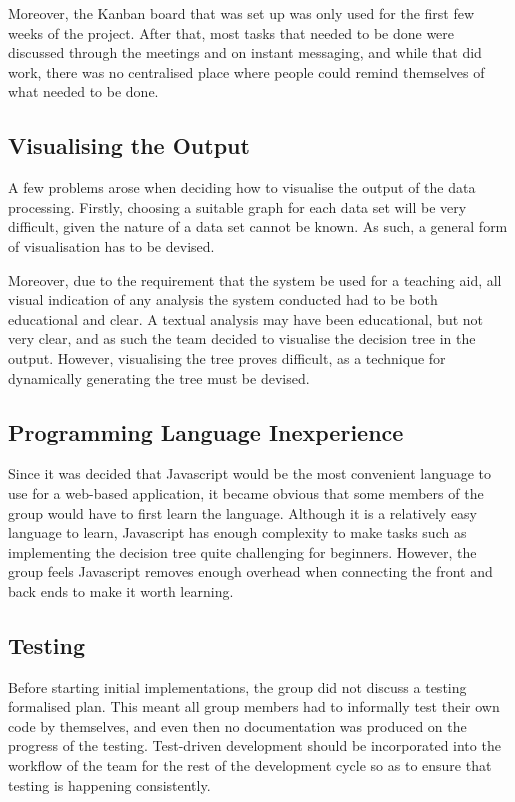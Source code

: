 \documentclass[a4paper,titlepage]{article}
\begin{document}
Moreover, the Kanban board that was set up was only used for the first few weeks of the project.
After that, most tasks that needed to be done were discussed through the meetings and on instant messaging, and while that did work, there was no centralised place where people could remind themselves of what needed to be done.

\subsection{Visualising the Output}
A few problems arose when deciding how to visualise the output of the data processing.
Firstly, choosing a suitable graph for each data set will be very difficult, given the nature of a data set cannot be known.
As such, a general form of visualisation has to be devised.

Moreover, due to the requirement that the system be used for a teaching aid, all visual indication of any analysis the system conducted had to be both educational and clear.
A textual analysis may have been educational, but not very clear, and as such the team decided to visualise the decision tree in the output.
However, visualising the tree proves difficult, as a technique for dynamically generating the tree must be devised.

\subsection{Programming Language Inexperience}
Since it was decided that Javascript would be the most convenient language to use for a web-based application, it became obvious that some members of the group would have to first learn the language.
Although it is a relatively easy language to learn, Javascript has enough complexity to make tasks such as implementing the decision tree quite challenging for beginners.
However, the group feels Javascript removes enough overhead when connecting the front and back ends to make it worth learning.

\subsection{Testing}
Before starting initial implementations, the group did not discuss a testing formalised plan.
This meant all group members had to informally test their own code by themselves, and even then no documentation was produced on the progress of the testing.
Test-driven development should be incorporated into the workflow of the team for the rest of the development cycle so as to ensure that testing is happening consistently.
\end{document}
